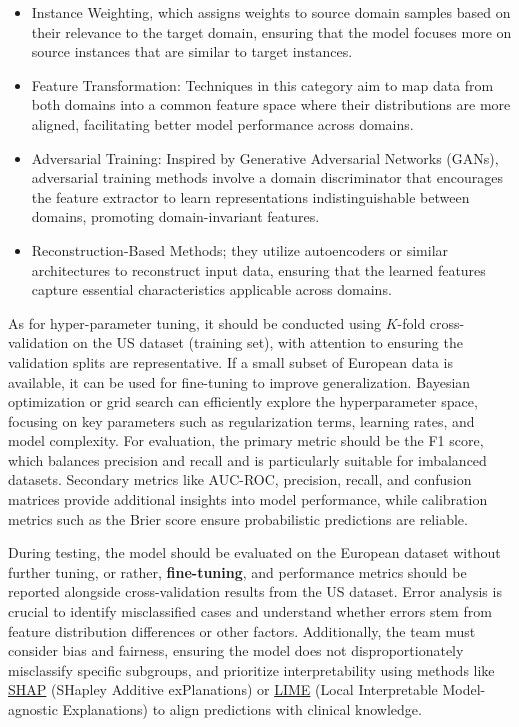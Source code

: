 \documentclass[letterpaper]{article}
\begin{document}
		\begin{itemize}
			\item Instance Weighting, which assigns weights to source domain samples based on their relevance to the target domain, ensuring that the model focuses more on source instances that are similar to target instances.
			
			\item  Feature Transformation: Techniques in this category aim to map data from both domains into a common feature space where their distributions are more aligned, facilitating better model performance across domains.
			
			\item Adversarial Training: Inspired by Generative Adversarial Networks (GANs), adversarial training methods involve a domain discriminator that encourages the feature extractor to learn representations indistinguishable between domains, promoting domain-invariant features.
		
		\item Reconstruction-Based Methods; they utilize autoencoders or similar architectures to reconstruct input data, ensuring that the learned features capture essential characteristics applicable across domains.
		\end{itemize}
		
		
		As for hyper-parameter tuning, it should be conducted using $K$-fold cross-validation on the US dataset (training set), with attention to ensuring the validation splits are representative. If a small subset of European data is available, it can be used for fine-tuning to improve generalization. Bayesian optimization or grid search can efficiently explore the hyperparameter space, focusing on key parameters such as regularization terms, learning rates, and model complexity. For evaluation, the primary metric should be the F1 score, which balances precision and recall and is particularly suitable for imbalanced datasets. Secondary metrics like AUC-ROC, precision, recall, and confusion matrices provide additional insights into model performance, while calibration metrics such as the Brier score ensure probabilistic predictions are reliable.
		
		During testing, the model should be evaluated on the European dataset without further tuning, or rather, \textbf{fine-tuning}, and performance metrics should be reported alongside cross-validation results from the US dataset. Error analysis is crucial to identify misclassified cases and understand whether errors stem from feature distribution differences or other factors. Additionally, the team must consider bias and fairness, ensuring the model does not disproportionately misclassify specific subgroups, and prioritize interpretability using methods like \href{https://acerta.ai/blog/understanding-machine-learning-with-shap-analysis/}{SHAP} (SHapley Additive exPlanations) or \href{https://c3.ai/glossary/data-science/lime-local-interpretable-model-agnostic-explanations}{LIME} (Local Interpretable Model-agnostic Explanations) to align predictions with clinical knowledge. 
		
\end{document}
